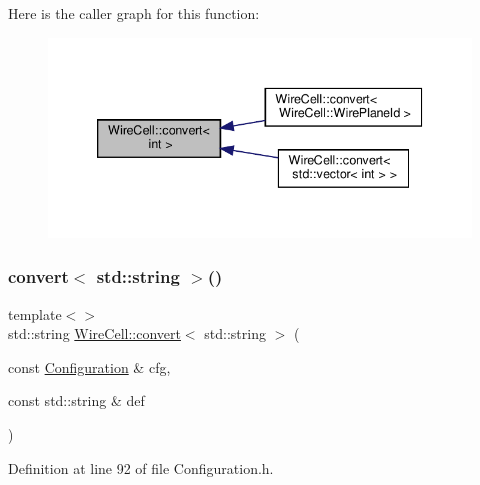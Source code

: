 Here is the caller graph for this function\+:
\nopagebreak
\begin{figure}[H]
\begin{center}
\leavevmode
\includegraphics[width=339pt]{namespace_wire_cell_aaf4b353f8d18d8e510569614e22b8bab_icgraph}
\end{center}
\end{figure}
\mbox{\label{namespace_wire_cell_ab3c7d840d10160c3ba263190198fed68}} 
\subsubsection{\texorpdfstring{convert$<$ std\+::string $>$()}{convert< std::string >()}}
{\footnotesize\ttfamily template$<$$>$ \\
std\+::string \hyperlink{namespace_wire_cell_a5f6648d6ae801b20a17b8a35fd3306e5}{Wire\+Cell\+::convert}$<$ std\+::string $>$ (\begin{DoxyParamCaption}\item[{const \hyperlink{namespace_wire_cell_a9f705541fc1d46c608b3d32c182333ee}{Configuration} \&}]{cfg,  }\item[{const std\+::string \&}]{def }\end{DoxyParamCaption})\hspace{0.3cm}{\ttfamily [inline]}}



Definition at line 92 of file Configuration.\+h.

\mbox{\label{namespace_wire_cell_abb75ebf5f2ee143cd568e7d8db4f4db4}} 
